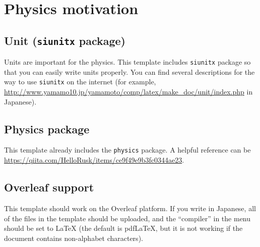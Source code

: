 \chapter{Physics motivation}

\section{Unit (\texttt{siunitx} package)}

Units are important for the physics. This template includes \texttt{siunitx} package so that you can easily write units properly. You can find several descriptions for the way to use \texttt{siunitx} on the internet (for example, \url{http://www.yamamo10.jp/yamamoto/comp/latex/make_doc/unit/index.php} in Japanese).  

\section{Physics package}

This template already includes the \texttt{physics} package. A helpful reference can be \url{https://qiita.com/HelloRusk/items/ce9f49e9b3fc0344ae23}. 


\section{Overleaf support}

This template should work on the Overleaf platform. If you write in Japanese, all of the files in the template should be uploaded, and the ``compiler'' in the menu should be set to LaTeX (the default is pdfLaTeX, but it is not working if the document contains non-alphabet characters). 
